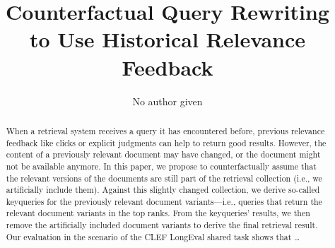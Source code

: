 \title{Counterfactual Query Rewriting \\ to Use Historical Relevance Feedback}

\author{No author given}



\maketitle

\begin{abstract}
When a retrieval system receives a query it has encountered before, previous relevance feedback like clicks or explicit judgments can help to return good results. However, the content of a previously relevant document may have changed, or the document might not be available anymore. In this paper, we propose to counterfactually assume that the relevant versions of the documents are still part of the retrieval collection (i.e., we artificially include them). Against this slightly changed collection, we derive so-called keyqueries for the previously relevant document variants---i.e., queries that return the relevant document variants in the top ranks. From the keyqueries' results, we then remove the artificially included document variants to derive the final retrieval result. Our evaluation in the scenario of the CLEF LongEval shared task shows that \ldots

\end{abstract}
